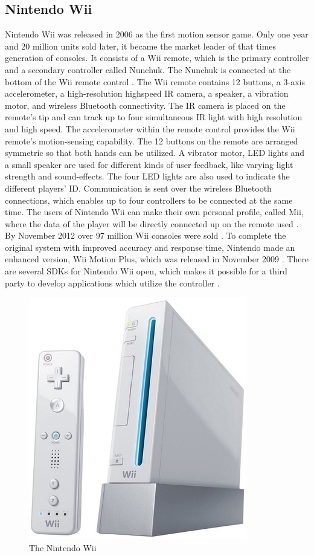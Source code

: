 \subsection{Nintendo Wii}
Nintendo Wii was released in 2006 as the first motion sensor game. Only one year and 20 million units sold later, it became the market leader of that times generation of consoles. It consists of a Wii remote, which is the primary controller and a secondary controller called Nunchuk. The Nunchuk is connected at the bottom of the Wii remote control \cite{hackingwii}. The Wii remote contains 12 buttons, a 3-axis accelerometer, a high-resolution highspeed IR camera, a speaker, a vibration motor, and wireless Bluetooth connectivity.
The IR camera is placed on the remote's tip and can track up to four simultaneous IR light with high resolution and high speed. The accelerometer within the remote control provides the Wii remote’s motion-sensing capability. The 12 buttons on the remote are arranged symmetric so that both hands can be utilized. A vibrator motor, LED lights and a small speaker are used for different kinds of user feedback, like varying light strength and sound-effects. The four LED lights are also used to indicate the different players' ID. Communication is sent over the wireless Bluetooth connections, which enables up to four controllers to be connected at the same time.  The users of Nintendo Wii can make their own personal profile, called Mii, where the data of the player will be directly connected up on the remote used  \cite{hackingwii} \cite{whatiswii}. By November 2012 over 97 million Wii consoles were sold \cite{vgchartzhardware}.  To complete the original system with improved accuracy and response time, Nintendo made an enhanced version, Wii Motion Plus, which was released in November 2009 \cite{consoles}. There are several SDKs for Nintendo Wii open, which makes it possible for a third party to develop applications which utilize the controller \cite{comparison}. 
\begin{figure}[h!]
\begin{center}
\includegraphics[scale=0.3]{nintendowii}
\caption[Nitendo Wii]{The Nintendo Wii}
\label{fig:NintendoWii}
\end{center}
\end{figure}

